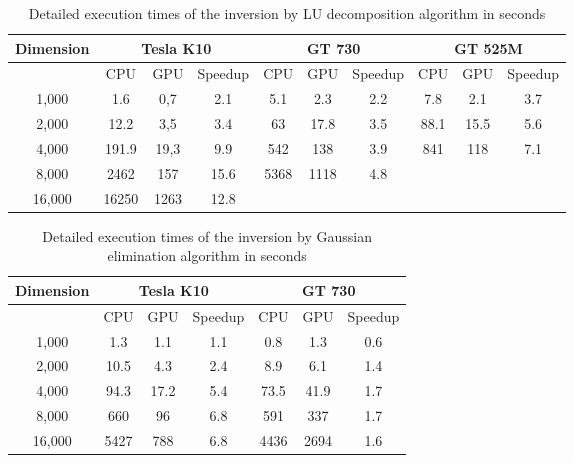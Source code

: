 \begin{table*}
	\begin{tabular}{|c|c|c|c|c|c|c|c|c|c|}\hline
		\rowcolor{black!20} \textbf{Dimension} & \multicolumn{3}{c}{ \textbf{Tesla K10}} & \multicolumn{3}{c}{ \textbf{GT 730}} & \multicolumn{3}{c}{ \textbf{GT 525M}} \\\hline
			\rowcolor{black!20} & CPU & GPU & Speedup & CPU & GPU & Speedup & CPU & GPU & Speedup \\\hline\hline
		1,000 & 1.6 & 0,7 & 2.1 & 5.1 & 2.3 & 2.2 & 7.8 & 2.1 & 3.7 \\\hline
		2,000 & 12.2 & 3,5 & 3.4 & 63 & 17.8 & 3.5 & 88.1 & 15.5 & 5.6 \\\hline
		4,000 & 191.9 & 19,3 & 9.9 & 542 & 138 & 3.9 & 841 & 118 & 7.1 \\\hline
		8,000 & 2462 & 157 & 15.6 & 5368 & 1118 & 4.8 & & & \\\hline
		16,000 & 16250 & 1263 & 12.8 &  & & & & & \\\hline
	\end{tabular}
	\centering
	\label{tab:results1}
	\caption{Detailed execution times of the inversion by LU decomposition algorithm in seconds}
\end{table*}
\begin{table*}
	\begin{tabular}{|c|c|c|c|c|c|c|}\hline
		\rowcolor{black!20} \textbf{Dimension} & \multicolumn{3}{c}{ \textbf{Tesla K10}} & \multicolumn{3}{c}{ \textbf{GT 730}}  \\\hline
		\rowcolor{black!20} & CPU & GPU & Speedup & CPU & GPU & Speedup \\\hline\hline
		1,000 & 1.3 & 1.1 & 1.1 & 0.8 & 1.3 & 0.6 \\\hline
		2,000 & 10.5 & 4.3 & 2.4 & 8.9 & 6.1 & 1.4 \\\hline
		4,000 & 94.3 & 17.2 & 5.4 & 73.5 & 41.9 & 1.7  \\\hline
		8,000 & 660 & 96 & 6.8 & 591 & 337 &  1.7 \\\hline
		16,000 & 5427 & 788  & 6.8  & 4436 & 2694 & 1.6 \\\hline
	\end{tabular}
	\centering
	\label{tab:results2}
	\caption{Detailed execution times of the inversion by Gaussian elimination algorithm in seconds}
\end{table*}

